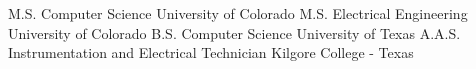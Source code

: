 

\begin{cventries}
  \cventry
    {M.S. Computer Science} %
    {University of Colorado} %
    {} %
    {} %
    {} %
  \cventry
    {M.S. Electrical Engineering} %
    {University of Colorado} %
    {} %
    {} %
    {} %
  \cventry
    {B.S. Computer Science} %
    {University of Texas} %
    {} %
    {} %
    {} %
  \cventry
    {A.A.S. Instrumentation and Electrical Technician} %
    {Kilgore College - Texas} %
    {} %
    {} %
    {} %
\end{cventries}

